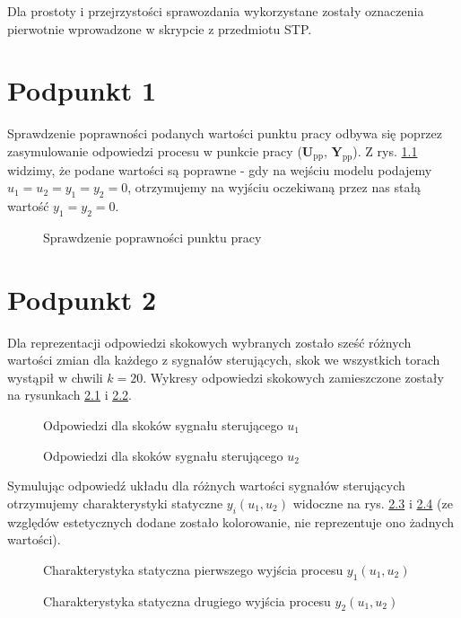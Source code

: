 Dla prostoty i przejrzystości sprawozdania wykorzystane zostały oznaczenia pierwotnie wprowadzone w skrypcie z przedmiotu STP.

\chapter{Podpunkt 1}
Sprawdzenie poprawności podanych wartości punktu pracy odbywa się poprzez zasymulowanie odpowiedzi procesu w punkcie pracy ($\boldsymbol{U}_{\mathrm{pp}}$, $\boldsymbol{Y}_{\mathrm{pp}}$). Z rys. \ref{Z1} widzimy, że podane wartości są poprawne - gdy na wejściu modelu podajemy $u_1=u_2=y_1=y_2=0$, otrzymujemy na wyjściu oczekiwaną przez nas stałą wartość $y_1=y_2=\num{0}$.

\begin{figure}[ht]
\centering

\caption{Sprawdzenie poprawności punktu pracy}
\label{Z1}
\end{figure}


\chapter{Podpunkt 2}
Dla reprezentacji odpowiedzi skokowych wybranych zostało sześć różnych wartości zmian dla każdego z sygnałów sterujących, skok we wszystkich torach wystąpił w chwili $k=20$. Wykresy odpowiedzi skokowych zamieszczone zostały na rysunkach \ref{Z2U1} i \ref{Z2U2}.

\begin{figure}[ht]
\centering

\caption{Odpowiedzi dla skoków sygnału sterującego $u_1$} 
\label{Z2U1}
\end{figure}

\begin{figure}[ht]
\centering

\caption{Odpowiedzi dla skoków sygnału sterującego $u_2$}
\label{Z2U2}
\end{figure}

Symulując odpowiedź układu dla różnych wartości sygnałów sterujących otrzymujemy charakterystyki statyczne $y_{i}(u_1,u_2)$ widoczne na rys. \ref{Z2Y1stat} i \ref{Z2Y2stat} (ze względów estetycznych dodane zostało kolorowanie, nie reprezentuje ono żadnych wartości).

\begin{figure}[ht]
\centering

\caption{Charakterystyka statyczna pierwszego wyjścia procesu $y_1(u_1,u_2)$}
\label{Z2Y1stat}
\end{figure}

\begin{figure}[ht]
\centering

\caption{Charakterystyka statyczna drugiego wyjścia procesu $y_2(u_1,u_2)$}
\label{Z2Y2stat}
\end{figure}

